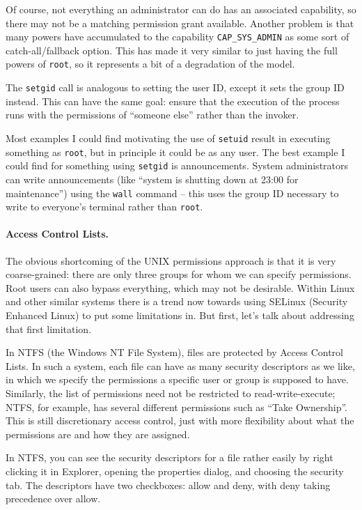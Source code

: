 Of course, not everything an administrator can do has an associated capability, so there may not be a matching permission grant available. Another problem is that many powers have accumulated to the capability \texttt{CAP\_SYS\_ADMIN} as some sort of catch-all/fallback option. This has made it very similar to just having the full powers of \texttt{root}, so it represents a bit of a degradation of the model. 

The \texttt{setgid} call is analogous to setting the user ID, except it sets the group ID instead. This can have the same goal: ensure that the execution of the process runs with the permissions of ``someone else'' rather than the invoker.

Most examples I could find motivating the use of \texttt{setuid} result in executing something as \texttt{root}, but in principle it could be as any user. The best example I could find for something using \texttt{setgid} is announcements. System administrators can write announcements (like ``system is shutting down at 23:00 for maintenance'') using the \texttt{wall} command -- this uses the group ID necessary to write to everyone's terminal rather than \texttt{root}. 


\paragraph{Access Control Lists.}

The obvious shortcoming of the UNIX permissions approach is that it is very coarse-grained: there are only three groups for whom we can specify permissions. Root users can also bypass everything, which may not be desirable. Within Linux and other similar systems there is a trend now towards using SELinux (Security Enhanced Linux)  to put some limitations in. But first, let's talk about addressing that first limitation.

In NTFS (the Windows NT File System), files are protected by Access Control Lists. In such a system, each file can have as many security descriptors as we like, in which we specify the permissions a specific user or group is supposed to have. Similarly, the list of permissions need not be restricted to read-write-execute; NTFS, for example, has several different permissions such as ``Take Ownership''. This is still discretionary access control, just with more flexibility about what the permissions are and how they are assigned.

In NTFS, you can see the security descriptors for a file rather easily by right clicking it in Explorer, opening the properties dialog, and choosing the security tab. The descriptors have two checkboxes: allow and deny, with deny taking precedence over allow.

